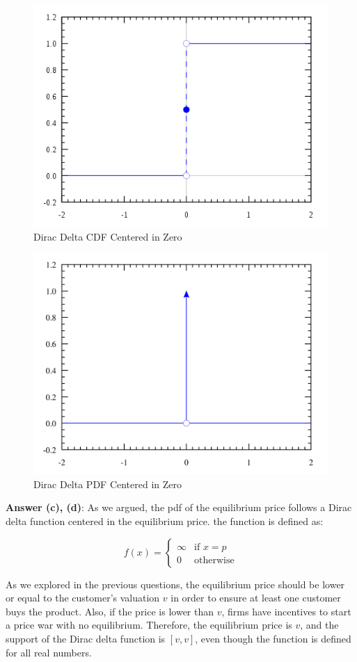 \begin{figure}[H]
    \centering
    \includegraphics[width=0.5\linewidth]{plots/dirac-cdf.png}
    \caption{Dirac Delta CDF Centered in Zero}
    \label{fig:dirac-delta-cdf}
\end{figure}

\begin{figure}[H]
    \centering
    \includegraphics[width=0.5\linewidth]{plots/dirac-pdf.png}
    \caption{Dirac Delta PDF Centered in Zero}
    \label{fig:dirac-delta-pdf}
\end{figure}

\begin{myanswerbox}
    \textbf{Answer (c), (d)}:
    As we argued, the pdf of the equilibrium price follows a Dirac delta function centered in the equilibrium price. the function is defined as:
    
\begin{equation*}
    f(x) = 
    \begin{cases}
        \infty & \text{if } x = p\\
        0 & \text{otherwise}
    \end{cases}
\end{equation*}

\end{myanswerbox}

\begin{myanswerbox}
    As we explored in the previous questions, the equilibrium price should be lower or equal to the customer's valuation \( v \) in order to ensure at least one customer buys the product. Also, if the price is lower than \( v \), firms have incentives to start a price war with no equilibrium. Therefore, the equilibrium price is \( v \), and the support of the Dirac delta function is \([v, v]\), even though the function is defined for all real numbers.
\end{myanswerbox}
